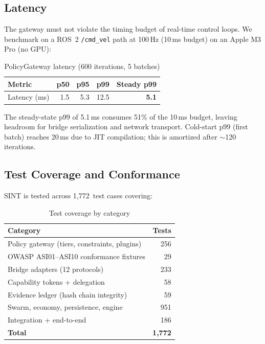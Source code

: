\documentclass[conference]{IEEEtran}
\begin{document}
\subsection{Latency}

The gateway must not violate the timing budget of real-time control loops.
We benchmark on a ROS~2 \texttt{/cmd\_vel} path at 100\,Hz (10\,ms budget)
on an Apple M3 Pro (no GPU):

\begin{table}[h]
\centering
\caption{PolicyGateway latency (600 iterations, 5 batches)}
\label{tab:latency}
\begin{tabular}{@{}lrrrr@{}}
\toprule
Metric & p50 & p95 & p99 & Steady p99 \\
\midrule
Latency (ms) & 1.5 & 5.3 & 12.5 & \textbf{5.1} \\
\bottomrule
\end{tabular}
\end{table}

The steady-state p99 of 5.1\,ms consumes 51\% of the 10\,ms budget, leaving
headroom for bridge serialization and network transport.
Cold-start p99 (first batch) reaches 20\,ms due to JIT compilation; this is
amortized after $\sim$120 iterations.

\subsection{Test Coverage and Conformance}

SINT is tested across 1,772~test cases covering:

\begin{table}[h]
\centering
\caption{Test coverage by category}
\label{tab:tests}
\begin{tabular}{@{}lr@{}}
\toprule
Category & Tests \\
\midrule
Policy gateway (tiers, constraints, plugins) & 256 \\
OWASP ASI01--ASI10 conformance fixtures & 29 \\
Bridge adapters (12 protocols) & 233 \\
Capability tokens + delegation & 58 \\
Evidence ledger (hash chain integrity) & 59 \\
Swarm, economy, persistence, engine & 951 \\
Integration + end-to-end & 186 \\
\midrule
\textbf{Total} & \textbf{1,772} \\
\bottomrule
\end{tabular}
\end{table}
\end{document}
